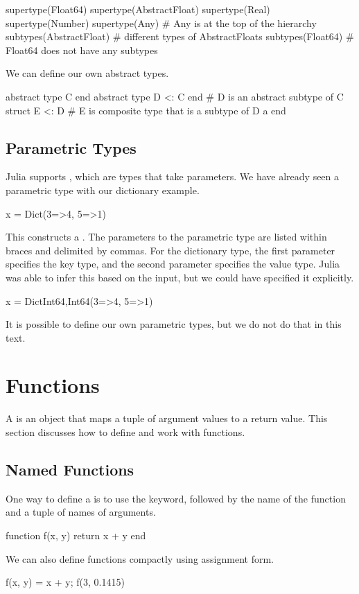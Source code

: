 \begin{juliaconsole}
supertype(Float64)
supertype(AbstractFloat)
supertype(Real)
supertype(Number)
supertype(Any)          # Any is at the top of the hierarchy
subtypes(AbstractFloat) # different types of AbstractFloats
subtypes(Float64)       # Float64 does not have any subtypes
\end{juliaconsole}


We can define our own abstract types.
\begin{juliaverbatim}
abstract type C end
abstract type D <: C end # D is an abstract subtype of C
struct E <: D # E is composite type that is a subtype of D
    a
end
\end{juliaverbatim}

\subsection{Parametric Types}

Julia supports , which are types that take parameters. We have already seen a parametric type with our dictionary example.
\begin{juliaconsole}
x = Dict(3=>4, 5=>1)
\end{juliaconsole}
This constructs a . The parameters to the parametric type are listed within braces and delimited by commas. For the dictionary type, the first parameter specifies the key type, and the second parameter specifies the value type. Julia was able to infer this based on the input, but we could have specified it explicitly.
\begin{juliaconsole}
x = Dict{Int64,Int64}(3=>4, 5=>1)
\end{juliaconsole}
It is possible to define our own parametric types, but we do not do that in this text.

\section{Functions}

A  is an object that maps a tuple of argument values to a return value. This section discusses how to define and work with functions.

\subsection{Named Functions}

One way to define a  is to use the  keyword, followed by the name of the function and a tuple of names of arguments.
\begin{juliaverbatim}
function f(x, y)
	return x + y
end
\end{juliaverbatim}
We can also define functions compactly using assignment form.
\begin{juliaconsole}[deffun]
f(x, y) = x + y;
f(3, 0.1415)
\end{juliaconsole}

